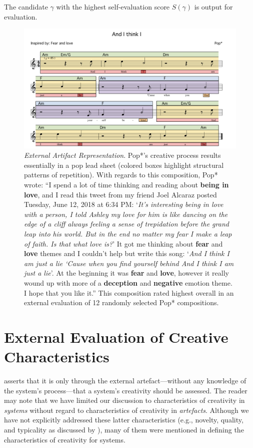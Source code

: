 \documentclass[phd,electronic,oneside,twosidetoc,letterpaper,chaptercenter,parttop,lof,lot]{byumsphd}
\begin{document}
The candidate $\gamma$ with the highest self-evaluation score $S(\gamma)$ is output for evaluation.

\begin{figure}
    \centering
    \includegraphics[width=\linewidth]{And_I_Think}
    \caption{\textit{External Artifact Representation}. Pop*'s creative process results essentially in a pop lead sheet (colored boxes highlight structural patterns of repetition). With regards to this composition, Pop* wrote: ``I spend a lot of time thinking and reading about \textbf{being in love}, and I read this tweet from my friend Joel Alcaraz posted Tuesday, June 12, 2018 at 6:34 PM: `\textit{It's interesting being in love with a person, I told Ashley my love for him is like dancing on the edge of a cliff always feeling a sense of trepidation before the grand leap into his world. But in the end no matter my fear I make a leap of faith. Is that what love is?}' It got me thinking about \textbf{fear} and \textbf{love} themes and I couldn't help but write this song: `\textit{And I think I am just a lie `Cause when you find yourself behind And I think I am just a lie}'. At the beginning it was \textbf{fear} and \textbf{love}, however it really wound up with more of a \textbf{deception} and \textbf{negative} emotion theme. I hope that you like it.'' This composition rated highest overall in an external evaluation of 12 randomly selected Pop* compositions.}
    \label{fig:cut_above}
\end{figure}

\section{External Evaluation of Creative Characteristics}

\citeauthor{Ritchie2007} \cite{Ritchie2007} asserts that it is only through the external artefact---without any knowledge of the system's process---that a system's creativity should be assessed. The reader may note that we have limited our discussion to characteristics of creativity in \textit{systems} without regard to characteristics of creativity in \textit{artefacts}. Although we have not explicitly addressed these latter characteristics (e.g., novelty, quality, and typicality as discussed by \citeauthor{Ritchie2007}), many of them were mentioned in defining the characteristics of creativity for systems.
\end{document}
